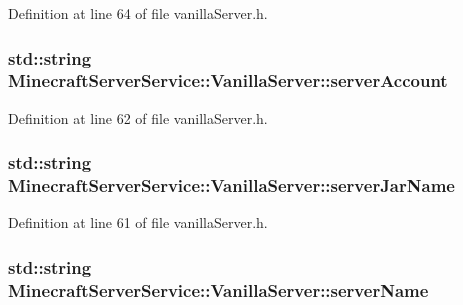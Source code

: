 Definition at line 64 of file vanilla\+Server.\+h.

\subsubsection[{\texorpdfstring{server\+Account}{serverAccount}}]{\setlength{\rightskip}{0pt plus 5cm}std\+::string Minecraft\+Server\+Service\+::\+Vanilla\+Server\+::server\+Account\hspace{0.3cm}{\ttfamily [protected]}}\hypertarget{class_minecraft_server_service_1_1_vanilla_server_a725f891aea7180f391ba188c67dbdeab}{}\label{class_minecraft_server_service_1_1_vanilla_server_a725f891aea7180f391ba188c67dbdeab}


Definition at line 62 of file vanilla\+Server.\+h.

\subsubsection[{\texorpdfstring{server\+Jar\+Name}{serverJarName}}]{\setlength{\rightskip}{0pt plus 5cm}std\+::string Minecraft\+Server\+Service\+::\+Vanilla\+Server\+::server\+Jar\+Name\hspace{0.3cm}{\ttfamily [protected]}}\hypertarget{class_minecraft_server_service_1_1_vanilla_server_aa52c191c12cdc8ed91dfbddf40331b62}{}\label{class_minecraft_server_service_1_1_vanilla_server_aa52c191c12cdc8ed91dfbddf40331b62}


Definition at line 61 of file vanilla\+Server.\+h.

\subsubsection[{\texorpdfstring{server\+Name}{serverName}}]{\setlength{\rightskip}{0pt plus 5cm}std\+::string Minecraft\+Server\+Service\+::\+Vanilla\+Server\+::server\+Name}\hypertarget{class_minecraft_server_service_1_1_vanilla_server_a83d99c03fe7dfc834e06a770b79419b1}{}\label{class_minecraft_server_service_1_1_vanilla_server_a83d99c03fe7dfc834e06a770b79419b1}


